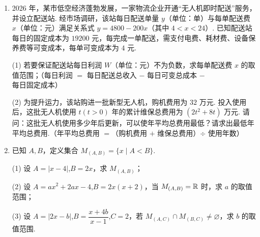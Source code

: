 \documentclass[a4paper,11pt]{article}
\begin{document}
\begin{enumerate}
\item 2026 年，某市低空经济蓬勃发展，一家物流企业开通“无人机即时配送”服务，并设立配送站. 经市场调研，该站每日配送单量 $y$（单位：单）与每单配送费 $x$（单位：元）满足关系式 $y=4800-200x$（其中 $4<x<24$）. 已知配送站每日的固定成本为 $19200$ 元，每完成一单配送，需支付电费、耗材费、设备保养费等可变成本，每单可变成本为 $4$ 元.

(1) 若要保证配送站每日利润 $W$（单位：元）不为负数，求每单配送费 $x$ 的取值范围；（每日利润 $=$ 每日配送总收入 $-$ 每日可变总成本 $-$ 每日固定成本）

(2) 为提升运力，该站购进一批新型无人机，购机费用为 $32$ 万元. 投入使用后，这批无人机使用 $t(t>0)$ 年的累计维保总费用为 $(2t^2+8t)$ 万元. 请问：这批无人机使用多少年后更新，可以使年平均总费用最低？请求出最低年平均总费用.（年平均总费用 $=$（购机费用 $+$ 维保总费用）$\div$ 使用年数）

\ifanswer
\solbegin
{}
\solend
\fi

\item 已知 $A,B$，定义集合 $M_{(A,B)}=\{x\mid A<B\}$.

(1) 设 $A=\lvert x-4\rvert$,$B=2x$，求 $M_{(A,B)}$；

(2) 设 $A=ax^2+2ax-4$,$B=2x(x+2)$，当 $M_{(A,B)}=\mathbb{R}$ 时，求 $a$ 的取值范围；

(3) 设 $A=\lvert 2x-b\rvert$,$B=\dfrac{x+4b}{x-1}$,$C=2$，若 $M_{(A,C)}\cap M_{(B,C)}\neq\varnothing$，求 $b$ 的取值范围.


\end{enumerate}
\end{document}
